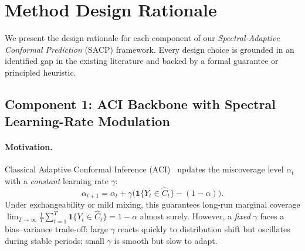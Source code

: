 
\section{Method Design Rationale}\label{sec:design-rationale}

We present the design rationale for each component of our
\emph{Spectral-Adaptive Conformal Prediction} (SACP) framework.  Every
design choice is grounded in an identified gap in the existing literature
and backed by a formal guarantee or principled heuristic.

\subsection{Component 1: ACI Backbone with Spectral Learning-Rate Modulation}
\label{sec:aci-spectral}

\paragraph{Motivation.}
Classical Adaptive Conformal Inference (ACI)~\citep{gibbs2021adaptive}
updates the miscoverage level $\alpha_t$ with a \emph{constant} learning
rate $\gamma$:
\begin{equation}\label{eq:aci-vanilla}
  \alpha_{t+1} = \alpha_t + \gamma\bigl(\mathbf{1}\{Y_t \in \hat{C}_t\}
    - (1-\alpha)\bigr).
\end{equation}
Under exchangeability or mild mixing, this guarantees long-run marginal
coverage $\lim_{T\to\infty}\frac{1}{T}\sum_{t=1}^{T}
\mathbf{1}\{Y_t\in\hat{C}_t\} = 1-\alpha$ almost surely.  However, a
\emph{fixed} $\gamma$ faces a bias--variance trade-off: large $\gamma$
reacts quickly to distribution shift but oscillates during stable periods;
small $\gamma$ is smooth but slow to adapt.

